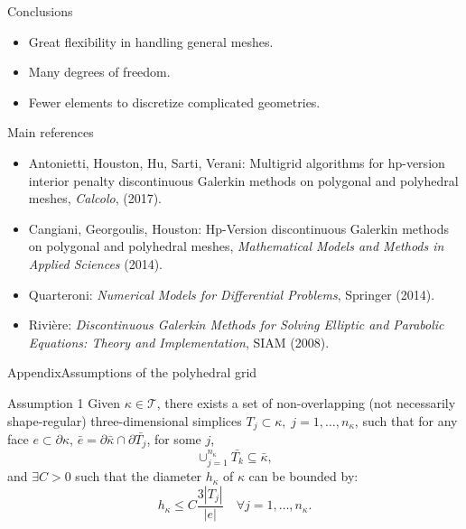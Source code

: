 \documentclass{beamer}
\begin{document}
\begin{frame}{Conclusions}
	\begin{itemize}
		\item Great flexibility in handling general meshes.
		\item Many degrees of freedom.
		\item Fewer elements to discretize complicated geometries.
	\end{itemize}
\end{frame}
\begin{frame}{Main references}
\begin{itemize}
	\item Antonietti, Houston, Hu, Sarti, Verani: Multigrid
	algorithms for hp-version interior penalty discontinuous Galerkin methods
	on polygonal and polyhedral meshes, \emph{Calcolo}, (2017).
	\item Cangiani, Georgoulis, Houston: Hp-Version discontinuous
	Galerkin methods on polygonal and polyhedral meshes, \emph{Mathematical
		Models and Methods in Applied Sciences} (2014).
	\item Quarteroni: \emph{Numerical Models for Differential Problems}, Springer (2014).
	\item Rivière: \emph{Discontinuous Galerkin Methods for Solving Elliptic and
		Parabolic Equations: Theory and Implementation}, SIAM (2008).
\end{itemize}
\end{frame}
\appendix
\begin{frame}[label=supplemental]{Appendix}{Assumptions of the polyhedral
grid}
	\begin{block}{Assumption 1}
		Given $\kappa \in \mathcal{T}$, there exists a set of non-overlapping
		(not
		necessarily shape-regular) three-dimensional simplices $T_j \subset
		\kappa,
		\; j = 1,\dots, n_\kappa$, such that for any face $e \subset \partial
		\kappa$, $\bar{e} = \partial \bar{\kappa} \cap \partial \bar{T_j}$, for
		some $j$,
		\begin{equation*}
		\cup_{j = 1}^{n_\kappa} \bar{T_k} \subseteq \bar{\kappa},
		\end{equation*}
		and  $\exists C > 0$ such that the diameter $h_\kappa$ of $\kappa$ can
		be bounded by:
		\begin{equation*}
		h_\kappa \leq C \frac{3 |T_j|}{|e|} \quad \forall j = 1,\dots,n_\kappa.
		\end{equation*}
	\end{block}
\end{frame}
\end{document}
